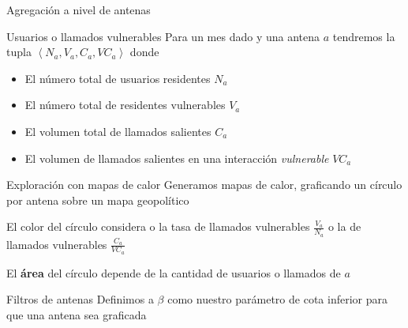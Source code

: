 \documentclass[xcolor=x11names]{beamer}
\begin{document}


\begin{frame}{Agregación a nivel de antenas}

	\begin{block}{Usuarios o llamados vulnerables}
	Para un mes dado y una antena $a$ tendremos la tupla $\left< N_a, V_a, C_a, VC_a \right>$ donde
		\begin{itemize}
			\item El número total de usuarios residentes $N_a$
			\item El número total de residentes vulnerables $V_a$
			\item El volumen total de llamados salientes $C_a$
			\item El volumen de llamados salientes en una interacción \textit{vulnerable} $VC_a$
		\end{itemize}
	\end{block}
\end{frame}

\begin{frame}{Exploración con mapas de calor }
		Generamos mapas de calor, graficando un círculo por antena sobre un mapa geopolítico

		\medskip
		El color del círculo considera o la tasa de llamados vulnerables $\frac{V_a}{N_a}$ o la de llamados vulnerables $\frac{C_a}{VC_a}$

		\medskip
		El \textbf{\'area} del círculo depende de la cantidad de usuarios o llamados de $a$


	\begin{block}{Filtros de antenas}
		Definimos a $\beta$ como nuestro parámetro de cota inferior para que una antena sea graficada

		\medskip

	\end{block}
\end{frame}
\end{document}
